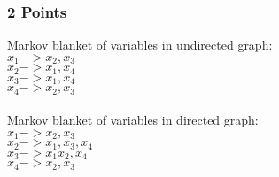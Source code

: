 \subsubsection{2 Points}
Markov blanket of variables in undirected graph:\\ 
$x_1->x_2,x_3$\\
$x_2->x_1,x_4$\\
$x_3->x_1,x_4$\\
$x_4->x_2,x_3$\\ \\
Markov blanket of variables in directed graph:\\
$x_1->x_2,x_3$\\
$x_2->x_1,x_3,x_4$\\
$x_3->x_1x_2,x_4$\\
$x_4->x_2,x_3$



